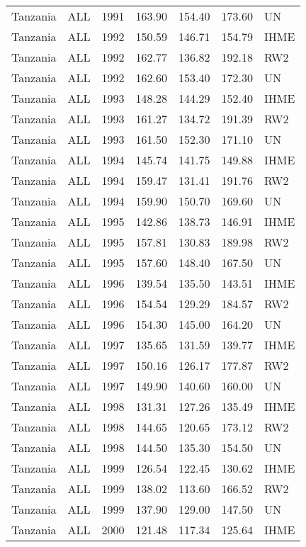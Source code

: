 \begin{longtable}{lllrrrl}
  Tanzania & ALL & 1991 & 163.90 & 154.40 & 173.60 & UN \\ 
  Tanzania & ALL & 1992 & 150.59 & 146.71 & 154.79 & IHME \\ 
  Tanzania & ALL & 1992 & 162.77 & 136.82 & 192.18 & RW2 \\ 
  Tanzania & ALL & 1992 & 162.60 & 153.40 & 172.30 & UN \\ 
  Tanzania & ALL & 1993 & 148.28 & 144.29 & 152.40 & IHME \\ 
  Tanzania & ALL & 1993 & 161.27 & 134.72 & 191.39 & RW2 \\ 
  Tanzania & ALL & 1993 & 161.50 & 152.30 & 171.10 & UN \\ 
  Tanzania & ALL & 1994 & 145.74 & 141.75 & 149.88 & IHME \\ 
  Tanzania & ALL & 1994 & 159.47 & 131.41 & 191.76 & RW2 \\ 
  Tanzania & ALL & 1994 & 159.90 & 150.70 & 169.60 & UN \\ 
  Tanzania & ALL & 1995 & 142.86 & 138.73 & 146.91 & IHME \\ 
  Tanzania & ALL & 1995 & 157.81 & 130.83 & 189.98 & RW2 \\ 
  Tanzania & ALL & 1995 & 157.60 & 148.40 & 167.50 & UN \\ 
  Tanzania & ALL & 1996 & 139.54 & 135.50 & 143.51 & IHME \\ 
  Tanzania & ALL & 1996 & 154.54 & 129.29 & 184.57 & RW2 \\ 
  Tanzania & ALL & 1996 & 154.30 & 145.00 & 164.20 & UN \\ 
  Tanzania & ALL & 1997 & 135.65 & 131.59 & 139.77 & IHME \\ 
  Tanzania & ALL & 1997 & 150.16 & 126.17 & 177.87 & RW2 \\ 
  Tanzania & ALL & 1997 & 149.90 & 140.60 & 160.00 & UN \\ 
  Tanzania & ALL & 1998 & 131.31 & 127.26 & 135.49 & IHME \\ 
  Tanzania & ALL & 1998 & 144.65 & 120.65 & 173.12 & RW2 \\ 
  Tanzania & ALL & 1998 & 144.50 & 135.30 & 154.50 & UN \\ 
  Tanzania & ALL & 1999 & 126.54 & 122.45 & 130.62 & IHME \\ 
  Tanzania & ALL & 1999 & 138.02 & 113.60 & 166.52 & RW2 \\ 
  Tanzania & ALL & 1999 & 137.90 & 129.00 & 147.50 & UN \\ 
  Tanzania & ALL & 2000 & 121.48 & 117.34 & 125.64 & IHME \\ 

\end{longtable}
